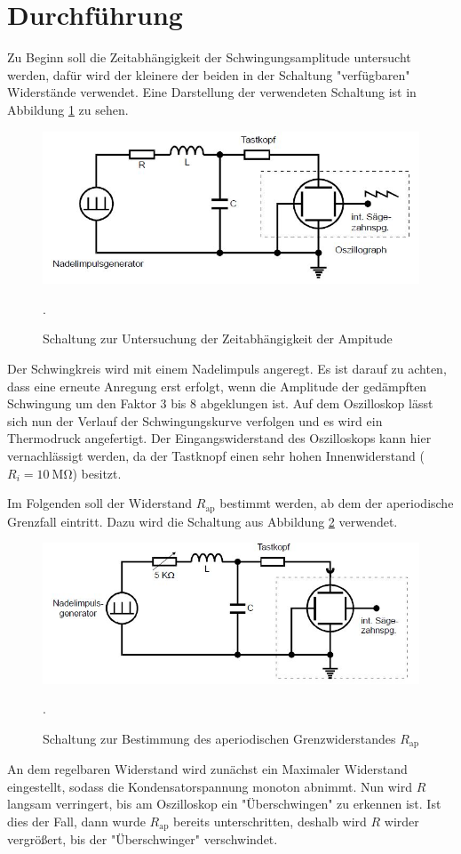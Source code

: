 \section{Durchführung}
Zu Beginn soll die Zeitabhängigkeit der Schwingungsamplitude untersucht werden, dafür
wird der kleinere der beiden in der Schaltung "verfügbaren" Widerstände verwendet.
Eine Darstellung der verwendeten Schaltung ist in Abbildung \ref{fig:a} zu sehen.
\begin{figure}[H]
  \centering
  \includegraphics[width=13cm]{a.JPG}
  \caption{Schaltung zur Untersuchung der Zeitabhängigkeit der Ampitude}
  \cite{skript}.
  \label{fig:a}
\end{figure}
Der Schwingkreis wird mit einem Nadelimpuls angeregt. Es ist darauf zu achten, dass
eine erneute Anregung erst erfolgt, wenn die Amplitude der gedämpften
Schwingung um den Faktor 3 bis 8 abgeklungen ist. Auf dem Oszilloskop lässt
sich nun der Verlauf der Schwingungskurve verfolgen und es wird ein
Thermodruck angefertigt.
Der Eingangswiderstand des Oszilloskops kann hier vernachlässigt werden, da der
Tastknopf einen sehr hohen Innenwiderstand ($R_{i}=\SI{10}{\mega\ohm}$) besitzt.

Im Folgenden soll der Widerstand $R_{\text{ap}}$ bestimmt werden, ab dem der aperiodische
Grenzfall eintritt. Dazu wird die Schaltung aus Abbildung \ref{fig:b} verwendet.
\begin{figure}[H]
  \centering
  \includegraphics[width=13cm]{b.JPG}
  \caption{Schaltung zur Bestimmung des aperiodischen Grenzwiderstandes $R_{\text{ap}}$}
  \cite{skript}.
  \label{fig:b}
\end{figure}
An dem regelbaren Widerstand wird zunächst ein Maximaler Widerstand eingestellt, sodass
die Kondensatorspannung monoton abnimmt. Nun wird $R$ langsam verringert, bis
am Oszilloskop ein "Überschwingen" zu erkennen ist. Ist dies der Fall, dann wurde
$R_{\text{ap}}$ bereits unterschritten, deshalb wird $R$ wirder vergrößert, bis der
"Überschwinger" verschwindet.


